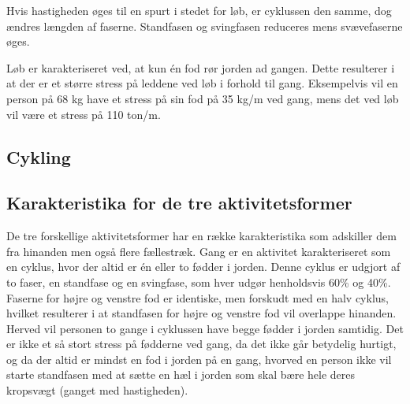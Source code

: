 Hvis hastigheden øges til en spurt i stedet for løb, er cyklussen den samme, dog ændres længden af faserne. Standfasen og svingfasen reduceres mens svævefaserne øges. \citep{Lee1998}

Løb er karakteriseret ved, at kun én fod rør jorden ad gangen. Dette resulterer i at der er et større stress på leddene ved løb i forhold til gang. Eksempelvis vil en person på 68 kg have et stress på sin fod på 35 kg/m ved gang, mens det ved løb vil være et stress på 110 ton/m. \citep{Adelaar1986}




\subsection{Cykling}





\subsection{Karakteristika for de tre aktivitetsformer}

%



De tre forskellige aktivitetsformer har en række karakteristika som adskiller dem fra hinanden men også flere fællestræk. \newline 
Gang er en aktivitet karakteriseret som en cyklus, hvor der altid er én eller to fødder i jorden. Denne cyklus er udgjort af to faser, en standfase og en svingfase, som hver udgør henholdsvis 60\% og 40\%.
Faserne for højre og venstre fod er identiske, men forskudt med en halv cyklus, hvilket resulterer i at standfasen for højre og venstre fod vil overlappe hinanden. Herved vil personen to gange i cyklussen have begge fødder i jorden samtidig. \newline
Det er ikke et så stort stress på fødderne ved gang, da det ikke går betydelig hurtigt, og da der altid er mindst en fod i jorden på en gang, hvorved en person ikke vil starte standfasen med at sætte en hæl i jorden som skal bære hele deres kropsvægt (ganget med hastigheden).


